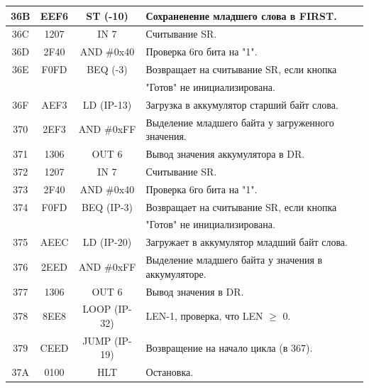 \begin{center}
\begin{tabular}{|c|c|c|l|}
        36B                   & EEF6                  & ST (-10)           & Сохраненение младшего слова в FIRST.               \\
        \hline
        36C                   & 1207                  & IN 7               & Считывание SR.                                      \\
        36D                   & 2F40                  & AND \#0x40         & Проверка 6го бита на "1".                           \\
        36E                   & F0FD                  & BEQ (-3)           & Возвращает на считывание SR, если кнопка            \\
        &                       &                    & "Готов" не инициализирована.                        \\
        36F                   & AEF3                  & LD (IP-13)         & Загрузка в аккумулятор старший байт слова.          \\
        370                   & 2EF3                  & AND \#0xFF         & Выделение младшего байта у загруженного значения.   \\
        371                   & 1306                  & OUT 6              & Вывод значения аккумулятора в DR.                   \\
        \hline
        372                   & 1207                  & IN 7               & Считывание SR.                                      \\
        373                   & 2F40                  & AND \#0x40         & Проверка 6го бита на "1".                           \\
        374                   & F0FD                  & BEQ (IP-3)         & Возвращает на считывание SR, если кнопка            \\
        &                       &                    & "Готов" не инициализирована.                        \\
        375                   & AEEC                  & LD (IP-20)         & Загружает в аккумулятор младший байт слова.         \\
        376                   & 2EED                  & AND \#0xFF         & Выделение младшего байта у значения в аккумуляторе. \\
        377                   & 1306                  & OUT 6              & Вывод значения в DR.                                \\
        378                   & 8EE8                  & LOOP (IP-32)       & LEN-1, проверка, что LEN $\geqslant$ 0.             \\
        379                   & CEED                  & JUMP (IP-19)       & Возвращение на начало цикла (в 367).                \\
        37A                   & 0100                  & HLT                & Остановка.                                          \\
        \hline

    \end{tabular}
\end{center}


